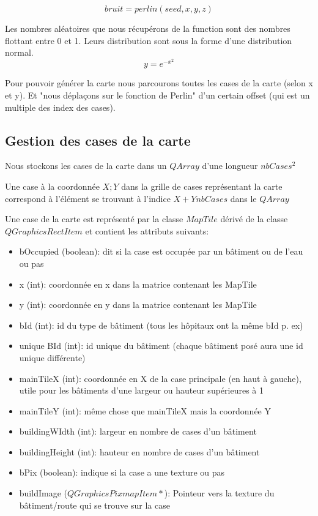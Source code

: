 \documentclass[a4paper,10pt,openany,oneside]{report}
\begin{document}
\[bruit = perlin(seed, x, y, z)\]

Les nombres aléatoires que nous récupérons de la function sont des nombres flottant entre 0 et 1.
Leurs distribution sont sous la forme d'une distribution normal.
\[y=e^{-x^{2}}\]

Pour pouvoir générer la carte nous parcourons toutes les cases de la carte (selon x et y). Et "nous déplaçons sur le fonction de Perlin" d'un certain offset (qui est un multiple des index des cases).
\subsection{Gestion des cases de la carte}
Nous stockons les cases de la carte dans un $QArray$ d'une longueur $nbCases^{2}$

Une case à la coordonnée $X;Y$ dans la grille de cases représentant la carte correspond à l'élément se trouvant à l'indice $X+Y nbCases$ dans le $QArray$

Une case de la carte est représenté par la classe $MapTile$ dérivé de la classe $QGraphicsRectItem$ et contient les attributs suivants:
\begin{itemize}
\item bOccupied (boolean): dit si la case est occupée par un bâtiment ou de l'eau ou pas
\item x (int): coordonnée en x dans la matrice contenant les MapTile
\item y (int): coordonnée en y dans la matrice contenant les MapTile
\item bId (int): id du type de bâtiment (tous les hôpitaux ont la même bId p. ex)
\item unique BId (int): id unique du bâtiment (chaque bâtiment posé aura une id unique différente)
\item mainTileX (int): coordonnée en X de la case principale (en haut à gauche), utile pour les bâtiments d'une largeur ou hauteur supérieures à 1
\item mainTileY (int): même chose que mainTileX mais la coordonnée Y
\item buildingWIdth (int): largeur en nombre de cases d'un bâtiment
\item buildingHeight (int): hauteur en nombre de cases d'un bâtiment
\item bPix (boolean): indique si la case a une texture ou pas
\item buildImage ($QGraphicsPixmapItem*$): Pointeur vers la texture du bâtiment/route qui se trouve sur la case
\end{itemize}
\end{document}
